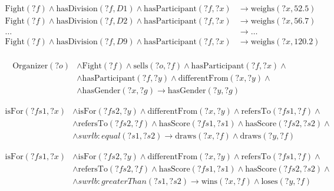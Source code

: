 \documentclass[a4paper]{article}
\begin{document}
\begin{align}
	\text{Fight}(?f) \land \text{hasDivision}(?f, D1) \land \text{hasParticipant}(?f, ?x) &\rightarrow \text{weighs}(?x, 52.5) \\
	\text{Fight}(?f) \land \text{hasDivision}(?f, D2) \land \text{hasParticipant}(?f, ?x) &\rightarrow \text{weighs}(?x, 56.7) \\
	\dots &\rightarrow \dots \\
	\text{Fight}(?f) \land \text{hasDivision}(?f, D9) \land \text{hasParticipant}(?f, ?x) &\rightarrow \text{weighs}(?x, 120.2) \\
	\label{formula:swrl_weightClasses}
\end{align}

\begin{equation}
	\begin{split}
		\text{Organizer}(?o) &\land \text{Fight}(?f) \land \text{sells}(?o, ?f) \land \text{hasParticipant}(?f, ?x) \land \\ 
							&\land \text{hasParticipant}(?f, ?y) \land \text{differentFrom}(?x, ?y) \land \\ 
							&\land \text{hasGender}(?x, ?g) \rightarrow \text{hasGender}(?y, ?g)
	\end{split}
	\label{formula:swrl_genderRule}
\end{equation}

\begin{equation}
	\begin{split}
		\text{isFor}(?fs1, ?x) &\land \text{isFor}(?fs2, ?y) \land \text{differentFrom}(?x, ?y) \land \text{refersTo}(?fs1, ?f) \land \\
							&\land \text{refersTo}(?fs2, ?f) \land \text{hasScore}(?fs1, ?s1) \land \text{hasScore}(?fs2, ?s2) \land \\ 
							&\land swrlb:equal(?s1, ?s2) \rightarrow \text{draws}(?x, ?f) \land \text{draws}(?y, ?f)
	\end{split}
	\label{formula:swrl_drawers}
\end{equation}

\begin{equation}
	\begin{split}
		\text{isFor}(?fs1, ?x) &\land \text{isFor}(?fs2, ?y) \land \text{differentFrom}(?x, ?y) \land \text{refersTo}(?fs1, ?f) \land \\
							&\land \text{refersTo}(?fs2, ?f) \land \text{hasScore}(?fs1, ?s1) \land \text{hasScore}(?fs2, ?s2) \land \\ 
							&\land swrlb:greaterThan(?s1, ?s2) \rightarrow \text{wins}(?x, ?f) \land \text{loses}(?y, ?f)
	\end{split}
	\label{formula:swrl_winner_loser}
\end{equation}
\end{document}

